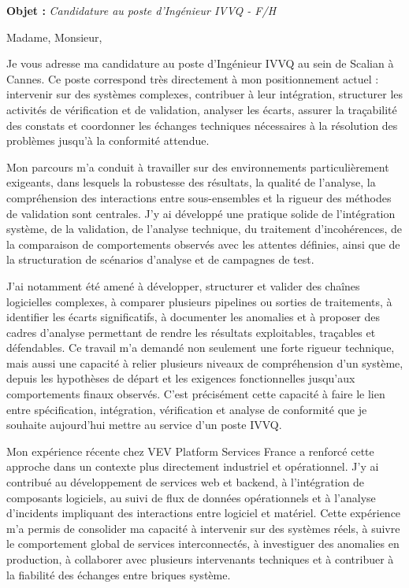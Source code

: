 \documentclass[11pt,a4paper]{altacv}
\begin{document}
\makecvheader
\vspace{-0.6cm}
\vspace{-0.4cm}

{\color{accent}\textbf{Objet :}} \textit{Candidature au poste d'Ingénieur IVVQ - F/H}

{\color{body}

Madame, Monsieur,

Je vous adresse ma candidature au poste d'Ingénieur IVVQ au sein de Scalian à Cannes. Ce poste correspond très directement à mon positionnement actuel : intervenir sur des systèmes complexes, contribuer à leur intégration, structurer les activités de vérification et de validation, analyser les écarts, assurer la traçabilité des constats et coordonner les échanges techniques nécessaires à la résolution des problèmes jusqu'à la conformité attendue.

Mon parcours m'a conduit à travailler sur des environnements particulièrement exigeants, dans lesquels la robustesse des résultats, la qualité de l'analyse, la compréhension des interactions entre sous-ensembles et la rigueur des méthodes de validation sont centrales. J'y ai développé une pratique solide de l'intégration système, de la validation, de l'analyse technique, du traitement d'incohérences, de la comparaison de comportements observés avec les attentes définies, ainsi que de la structuration de scénarios d'analyse et de campagnes de test.

J'ai notamment été amené à développer, structurer et valider des chaînes logicielles complexes, à comparer plusieurs pipelines ou sorties de traitements, à identifier les écarts significatifs, à documenter les anomalies et à proposer des cadres d'analyse permettant de rendre les résultats exploitables, traçables et défendables. Ce travail m'a demandé non seulement une forte rigueur technique, mais aussi une capacité à relier plusieurs niveaux de compréhension d'un système, depuis les hypothèses de départ et les exigences fonctionnelles jusqu'aux comportements finaux observés. C'est précisément cette capacité à faire le lien entre spécification, intégration, vérification et analyse de conformité que je souhaite aujourd'hui mettre au service d'un poste IVVQ.

Mon expérience récente chez VEV Platform Services France a renforcé cette approche dans un contexte plus directement industriel et opérationnel. J'y ai contribué au développement de services web et backend, à l'intégration de composants logiciels, au suivi de flux de données opérationnels et à l'analyse d'incidents impliquant des interactions entre logiciel et matériel. Cette expérience m'a permis de consolider ma capacité à intervenir sur des systèmes réels, à suivre le comportement global de services interconnectés, à investiguer des anomalies en production, à collaborer avec plusieurs intervenants techniques et à contribuer à la fiabilité des échanges entre briques système.

}
\end{document}
